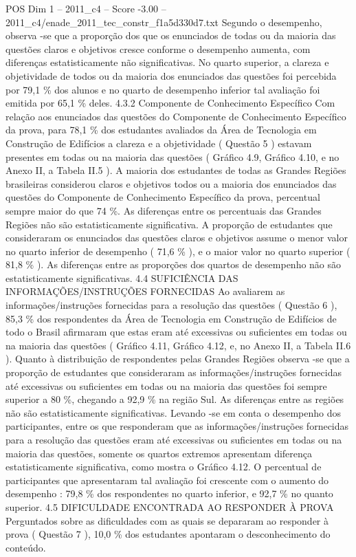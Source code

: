 \begin{textsample}{POS Dim 1 – 2011\_c4 – Score -3.00 – 2011\_c4/enade\_2011\_tec\_constr\_f1a5d330d7.txt}
Segundo o desempenho, observa -se que a proporção dos que os enunciados de todas ou da maioria das questões claros e objetivos cresce conforme o desempenho aumenta, com diferenças estatisticamente não significativas.
No quarto superior, a clareza e objetividade de todos ou da maioria dos enunciados das questões foi percebida por 79,1 \% dos alunos e no quarto de desempenho inferior tal avaliação foi emitida por 65,1 \% deles. 4.3.2 Componente de Conhecimento Específico Com relação aos enunciados das questões do Componente de Conhecimento Específico da prova, para 78,1 \% dos estudantes avaliados da Área de Tecnologia em Construção de Edifícios a clareza e a objetividade ( Questão 5 ) estavam presentes em todas ou na maioria das questões ( Gráfico 4.9, Gráfico 4.10, e no Anexo II, a Tabela II.5 ).
A maioria dos estudantes de todas as Grandes Regiões brasileiras considerou claros e objetivos todos ou a maioria dos enunciados das questões do Componente de Conhecimento Específico da prova, percentual sempre maior do que 74 \%.
As diferenças entre os percentuais das Grandes Regiões não são estatisticamente significativa.
A proporção de estudantes que consideraram os enunciados das questões claros e objetivos assume o menor valor no quarto inferior de desempenho ( 71,6 \% ), e o maior valor no quarto superior ( 81,8 \% ).
As diferenças entre as proporções dos quartos de desempenho não são estatisticamente significativas. 4.4 SUFICIÊNCIA DAS INFORMAÇÕES/INSTRUÇÕES FORNECIDAS Ao avaliarem as informações/instruções fornecidas para a resolução das questões ( Questão 6 ), 85,3 \% dos respondentes da Área de Tecnologia em Construção de Edifícios de todo o Brasil afirmaram que estas eram até excessivas ou suficientes em todas ou na maioria das questões ( Gráfico 4.11, Gráfico 4.12, e, no Anexo II, a Tabela II.6 ).
Quanto à distribuição de respondentes pelas Grandes Regiões observa -se que a proporção de estudantes que consideraram as informações/instruções fornecidas até excessivas ou suficientes em todas ou na maioria das questões foi sempre superior a 80 \%, chegando a 92,9 \% na região Sul.
As diferenças entre as regiões não são estatisticamente significativas.
Levando -se em conta o desempenho dos participantes, entre os que responderam que as informações/instruções fornecidas para a resolução das questões eram até excessivas ou suficientes em todas ou na maioria das questões, somente os quartos extremos apresentam diferença estatisticamente significativa, como mostra o Gráfico 4.12.
O percentual de participantes que apresentaram tal avaliação foi crescente com o aumento do desempenho : 79,8 \% dos respondentes no quarto inferior, e 92,7 \% no quanto superior. 4.5 DIFICULDADE ENCONTRADA AO RESPONDER À PROVA Perguntados sobre as dificuldades com as quais se depararam ao responder à prova ( Questão 7 ), 10,0 \% dos estudantes apontaram o desconhecimento do conteúdo.

\end{textsample}
